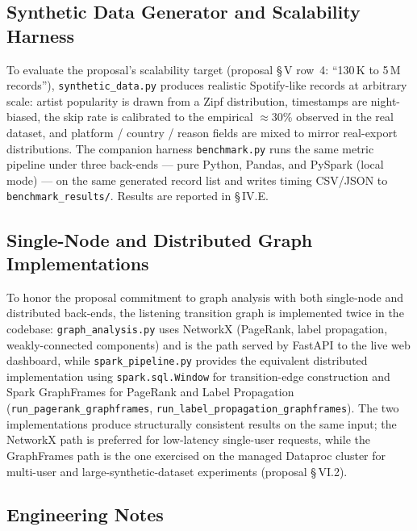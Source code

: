 \documentclass[conference]{IEEEtran}
\begin{document}
\subsection{Synthetic Data Generator and Scalability Harness}

To evaluate the proposal's scalability target (proposal \S\,V row~4: ``130\,K to 5\,M records''), \texttt{synthetic\_data.py} produces realistic Spotify-like records at arbitrary scale: artist popularity is drawn from a Zipf distribution, timestamps are night-biased, the skip rate is calibrated to the empirical $\approx$30\% observed in the real dataset, and platform / country / reason fields are mixed to mirror real-export distributions. The companion harness \texttt{benchmark.py} runs the same metric pipeline under three back-ends --- pure Python, Pandas, and PySpark (local mode) --- on the same generated record list and writes timing CSV/JSON to \texttt{benchmark\_results/}. Results are reported in \S\,IV.E.

\subsection{Single-Node and Distributed Graph Implementations}

To honor the proposal commitment to graph analysis with both single-node and distributed back-ends, the listening transition graph is implemented twice in the codebase: \texttt{graph\_analysis.py} uses NetworkX (PageRank, label propagation, weakly-connected components) and is the path served by FastAPI to the live web dashboard, while \texttt{spark\_pipeline.py} provides the equivalent distributed implementation using \texttt{spark.sql.Window} for transition-edge construction and Spark GraphFrames for PageRank and Label Propagation (\texttt{run\_pagerank\_graphframes}, \texttt{run\_label\_propagation\_graphframes}). The two implementations produce structurally consistent results on the same input; the NetworkX path is preferred for low-latency single-user requests, while the GraphFrames path is the one exercised on the managed Dataproc cluster for multi-user and large-synthetic-dataset experiments (proposal \S\,VI.2).

\subsection{Engineering Notes}
\end{document}
